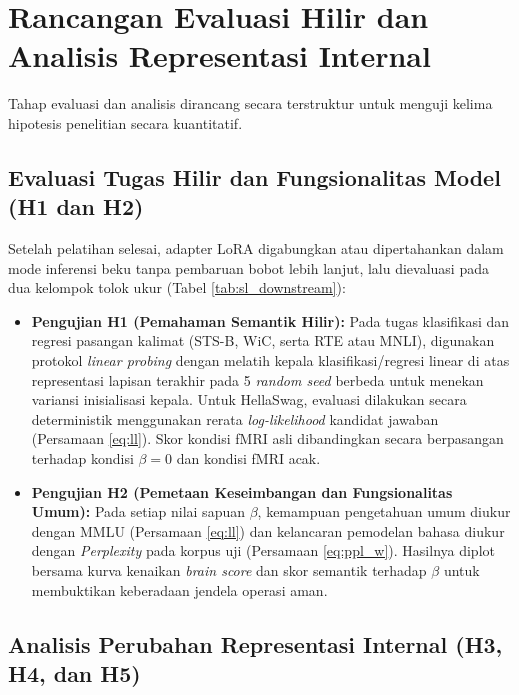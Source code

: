 \section{Rancangan Evaluasi Hilir dan Analisis Representasi Internal}
\label{sec:ds_evaluasi_analisis}

Tahap evaluasi dan analisis dirancang secara terstruktur untuk menguji kelima hipotesis penelitian secara kuantitatif.

\subsection{Evaluasi Tugas Hilir dan Fungsionalitas Model (H1 dan H2)}
\label{sub:ds_eval_hilir}

Setelah pelatihan selesai, adapter LoRA digabungkan atau dipertahankan dalam mode inferensi beku tanpa pembaruan bobot lebih lanjut, lalu dievaluasi pada dua kelompok tolok ukur (Tabel \ref{tab:sl_downstream}):
\begin{itemize}
  \item \textbf{Pengujian H1 (Pemahaman Semantik Hilir):} Pada tugas klasifikasi dan regresi pasangan kalimat (STS-B, WiC, serta RTE atau MNLI), digunakan protokol \textit{linear probing} dengan melatih kepala klasifikasi/regresi linear di atas representasi lapisan terakhir pada 5 \textit{random seed} berbeda untuk menekan variansi inisialisasi kepala. Untuk HellaSwag, evaluasi dilakukan secara deterministik menggunakan rerata \textit{log-likelihood} kandidat jawaban (Persamaan \ref{eq:ll}). Skor kondisi fMRI asli dibandingkan secara berpasangan terhadap kondisi $\beta = 0$ dan kondisi fMRI acak.
  \item \textbf{Pengujian H2 (Pemetaan Keseimbangan dan Fungsionalitas Umum):} Pada setiap nilai sapuan $\beta$, kemampuan pengetahuan umum diukur dengan MMLU (Persamaan \ref{eq:ll}) dan kelancaran pemodelan bahasa diukur dengan \textit{Perplexity} pada korpus uji (Persamaan \ref{eq:ppl_w}). Hasilnya diplot bersama kurva kenaikan \textit{brain score} dan skor semantik terhadap $\beta$ untuk membuktikan keberadaan jendela operasi aman.
\end{itemize}

\subsection{Analisis Perubahan Representasi Internal (H3, H4, dan H5)}
\label{sub:ds_analisis_internal}

